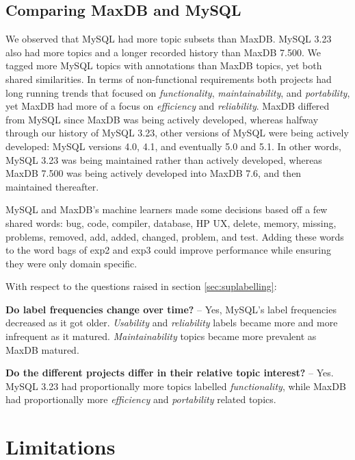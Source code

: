 \documentclass[]{sig-alternate}
\newcommand{\XXX}[1]{\textcolor{red}{{\it \textbf{[XXX: #1]}}}}
\begin{document}
\subsection{Comparing MaxDB and MySQL}

\label{sec:comparison}

We observed that MySQL had more topic subsets than MaxDB. 
MySQL 3.23 also had more topics and a longer recorded history than MaxDB 7.500. 
We tagged more MySQL topics with annotations than MaxDB topics, yet both shared similarities. 
In terms of non-functional requirements both projects had long running trends that focused on \emph{functionality}, \emph{maintainability}, and \emph{portability}, yet MaxDB had more of a focus on \emph{efficiency} and \emph{reliability}. 
MaxDB differed from MySQL since MaxDB was being actively developed, whereas halfway through our history of MySQL 3.23, other versions of MySQL were being actively developed: MySQL versions 4.0, 4.1, and eventually 5.0 and 5.1. 
In other words, MySQL 3.23 was being maintained rather than actively developed, whereas MaxDB 7.500 was being actively developed into MaxDB 7.6, and then maintained thereafter.

MySQL and MaxDB's machine learners made some decisions based off a few shared words: \textsf{bug, code, compiler, database, HP UX, delete, memory, missing, problems, removed, add, added, changed, problem, and test}. 
Adding these words to the word bags of \textsf{exp2} and \textsf{exp3} could improve performance while ensuring they were only domain specific.

With respect to the questions raised in section \ref{sec:suplabelling}:

\textbf{Do label frequencies change over time?} -- Yes, MySQL's label
frequencies decreased as it got older. \emph{Usability} and \emph{reliability}
labels became more and more infrequent as it matured. \emph{Maintainability} topics
became more prevalent as MaxDB matured.

\textbf{Do the different projects differ in their relative topic
  interest?} -- Yes. MySQL 3.23 had proportionally more
topics labelled \emph{functionality}, while MaxDB had proportionally more
\emph{efficiency} and \emph{portability} related topics.
 
\section{Limitations}
\label{sec:limit}
\end{document}
